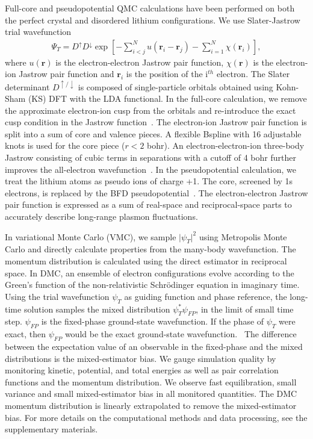 \documentclass[aps,prb,showpacs,preprintnumbers,amsmath,amssymb,superscriptaddress,twocolumn]{revtex4-1}
\newcommand{\bs}{\boldsymbol}
\newcommand{\up}{\uparrow}
\newcommand{\down}{\downarrow}
\begin{document}
Full-core and pseudopotential QMC calculations have been performed on both  the perfect crystal and disordered lithium configurations. %
We use Slater-Jastrow trial wavefunction
\begin{align}
\Psi_T = D^{\up} D^{\down} \exp\left[ -\sum\limits_{i<j}^{N} u(\bs{r}_i-\bs{r}_j) - \sum\limits_{i=1}^N \chi(\bs{r}_i) \right],\label{eq:sj}
\end{align}
where $u(\bs{r})$ is the electron-electron Jastrow pair function, $\chi(\bs{r})$ is the electron-ion Jastrow pair function and $\bs{r}_i$ is the position of the i$^{th}$ electron. The Slater determinant $D^{\up/\down}$ is composed of single-particle orbitals obtained using Kohn-Sham (KS) DFT with the LDA functional. In the full-core calculation, we remove the approximate electron-ion cusp from the orbitals and re-introduce the exact cusp condition in the Jastrow function~\cite{Ceperley1981}. The electron-ion Jastrow pair function is split into a sum of core and valence pieces. A flexible Bspline with 16 adjustable knots is used for the core piece ($r<2$ bohr). An electron-electron-ion three-body Jastrow consisting of cubic terms in separations with a cutoff of 4 bohr further improves the all-electron wavefunction~\cite{Drummond2004}. In the pseudopotential calculation, we treat the lithium atoms as pseudo ions of charge +1. The core, screened by 1s electrons, is replaced by the BFD pseudopotential~\cite{Burkatzki2007}.  The electron-electron Jastrow pair function is expressed as a sum of real-space and reciprocal-space parts to accurately describe long-range plasmon fluctuations.

In variational Monte Carlo (VMC), we sample $\vert \psi_T \vert^2$ using Metropolis Monte Carlo and directly calculate properties from the many-body wavefunction. The momentum distribution is calculated using the direct estimator in reciprocal space\cite{McMillan1965}. In DMC, an ensemble of electron configurations evolve according to the Green's function of the non-relativistic Schr\"odinger equation in imaginary time. Using the trial wavefunction $\psi_T$ as guiding function and phase reference, the long-time solution samples the mixed distribution $\psi^*_T\psi_{FP}$, in the limit of small time step. $\psi_{FP}$ is the fixed-phase ground-state wavefunction. If the phase of $\psi_T$ were exact, then $\psi_{FP}$ would be the exact ground-state wavefunction.~\cite{Ortiz1993} The difference between the expectation value of an observable in the fixed-phase and the mixed distributions is the mixed-estimator bias. We gauge simulation quality by monitoring kinetic, potential, and total energies as well as pair correlation functions and the momentum distribution. We observe fast equilibration, small variance and small mixed-estimator bias in all monitored quantities. The DMC momentum distribution is linearly extrapolated to remove the mixed-estimator bias. For more details on the computational methods and data processing, see the supplementary materials.
\end{document}
